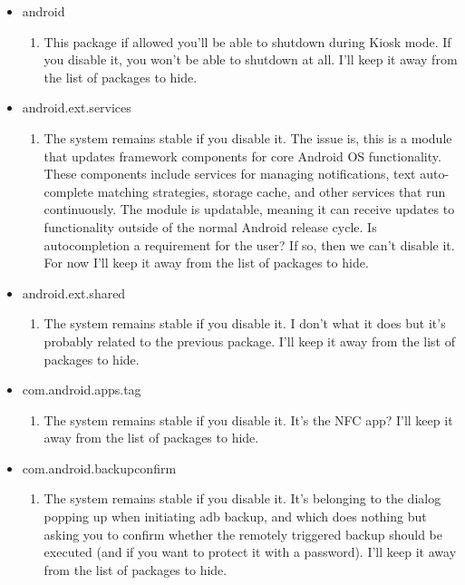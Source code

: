 \begin{itemize}
    \item android
    \begin{enumerate}
        \item This package if allowed you'll be able to shutdown during Kiosk mode. If you disable it, you won't be able to shutdown at all. I'll keep it away from the list of packages to hide.
    \end{enumerate}
    \item android.ext.services
        \begin{enumerate}
            \item The system remains stable if you disable it. The issue is, this is a module that updates framework components for core Android OS functionality. These components include services for managing notifications, text auto-complete matching strategies, storage cache, and other services that run continuously. The module is updatable, meaning it can receive updates to functionality outside of the normal Android release cycle. Is autocompletion a requirement for the user? If so, then we can't disable it. For now I'll keep it away from the list of packages to hide.
        \end{enumerate}
    \item android.ext.shared
        \begin{enumerate}
            \item The system remains stable if you disable it. I don't what it does but it's probably related to the previous package. I'll keep it away from the list of packages to hide.
        \end{enumerate}
    \item com.android.apps.tag
        \begin{enumerate}
            \item The system remains stable if you disable it. It's the NFC app? I'll keep it away from the list of packages to hide.
        \end{enumerate}
    \item com.android.backupconfirm
        \begin{enumerate}
            \item The system remains stable if you disable it. It's belonging to the dialog popping up when initiating adb backup, and which does nothing but asking you to confirm whether the remotely triggered backup should be executed (and if you want to protect it with a password). I'll keep it away from the list of packages to hide.

\end{enumerate}
\end{itemize}
